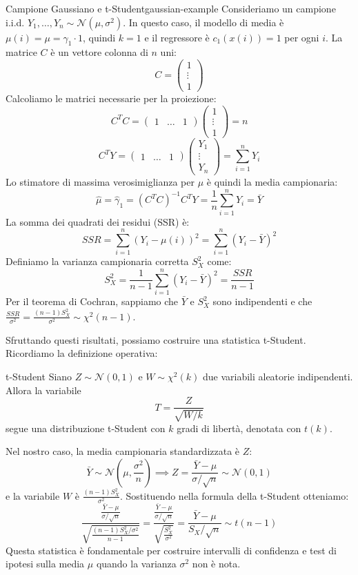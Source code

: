 \begin{esempio}{Campione Gaussiano e t-Student}{gaussian-example}
Consideriamo un campione i.i.d. $Y_1, \dots, Y_n \sim \mathcal{N}(\mu, \sigma^2)$. In questo caso, il modello di media è $\mu(i) = \mu = \gamma_1 \cdot 1$, quindi $k=1$ e il regressore è $c_1(x(i))=1$ per ogni $i$.
La matrice $C$ è un vettore colonna di $n$ uni:
\[
C = \begin{pmatrix} 1 \\ \vdots \\ 1 \end{pmatrix}
\]
Calcoliamo le matrici necessarie per la proiezione:
\[
C^T C = \begin{pmatrix} 1 & \dots & 1 \end{pmatrix} \begin{pmatrix} 1 \\ \vdots \\ 1 \end{pmatrix} = n
\]
\[
C^T Y = \begin{pmatrix} 1 & \dots & 1 \end{pmatrix} \begin{pmatrix} Y_1 \\ \vdots \\ Y_n \end{pmatrix} = \sum_{i=1}^n Y_i
\]
Lo stimatore di massima verosimiglianza per $\mu$ è quindi la media campionaria:
\[
\hat{\mu} = \hat{\gamma}_1 = (C^T C)^{-1} C^T Y = \frac{1}{n} \sum_{i=1}^n Y_i = \bar{Y}
\]
La somma dei quadrati dei residui (SSR) è:
\[
SSR = \sum_{i=1}^n (Y_i - \mu(i))^2 = \sum_{i=1}^n (Y_i - \bar{Y})^2
\]
Definiamo la varianza campionaria corretta $S_X^2$ come:
\[
S_X^2 = \frac{1}{n-1} \sum_{i=1}^n (Y_i - \bar{Y})^2 = \frac{SSR}{n-1}
\]
Per il teorema di Cochran, sappiamo che $\bar{Y}$ e $S_X^2$ sono indipendenti e che $\frac{SSR}{\sigma^2} = \frac{(n-1)S_X^2}{\sigma^2} \sim \chi^2(n-1)$.

Sfruttando questi risultati, possiamo costruire una statistica t-Student. Ricordiamo la definizione operativa:
\begin{nota}{t-Student}{}
Siano $Z \sim \mathcal{N}(0,1)$ e $W \sim \chi^2(k)$ due variabili aleatorie indipendenti. Allora la variabile
\[
T = \frac{Z}{\sqrt{W/k}}
\]
segue una distribuzione t-Student con $k$ gradi di libertà, denotata con $t(k)$.
\end{nota}
Nel nostro caso, la media campionaria standardizzata è $Z$:
\[
\bar{Y} \sim \mathcal{N}\left(\mu, \frac{\sigma^2}{n}\right) \implies Z = \frac{\bar{Y} - \mu}{\sigma/\sqrt{n}} \sim \mathcal{N}(0,1)
\]
e la variabile $W$ è $\frac{(n-1)S_X^2}{\sigma^2}$. Sostituendo nella formula della t-Student otteniamo:
\[
\frac{\frac{\bar{Y}-\mu}{\sigma/\sqrt{n}}}{\sqrt{\frac{(n-1)S_X^2/\sigma^2}{n-1}}} = \frac{\frac{\bar{Y}-\mu}{\sigma/\sqrt{n}}}{\sqrt{\frac{S_X^2}{\sigma^2}}} = \frac{\bar{Y}-\mu}{S_X/\sqrt{n}} \sim t(n-1)
\]
Questa statistica è fondamentale per costruire intervalli di confidenza e test di ipotesi sulla media $\mu$ quando la varianza $\sigma^2$ non è nota.
\end{esempio}

